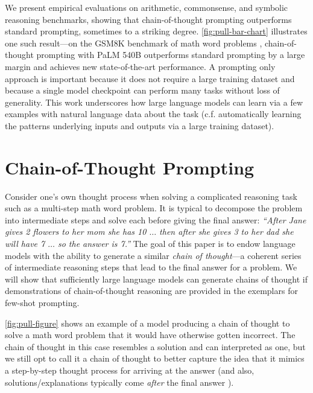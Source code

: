 \documentclass[]{article}
\theoremstyle{plain}
\theoremstyle{definition}
\theoremstyle{remark}
\newcommand{\palm}[0]{PaLM}
\begin{document}
We present empirical evaluations on arithmetic, commonsense, and symbolic reasoning benchmarks, showing that chain-of-thought prompting outperforms standard prompting, sometimes to a striking degree.
\cref{fig:pull-bar-chart} illustrates one such result---on the GSM8K benchmark of math word problems \citep{cobbe2021training}, chain-of-thought prompting with \palm{} 540B outperforms standard prompting by a large margin and achieves new state-of-the-art performance.
A prompting only approach is important because it does not require a large training dataset and because a single model checkpoint can perform many tasks without loss of generality.
This work underscores how large language models can learn via a few examples with natural language data about the task (c.f. automatically learning the patterns underlying inputs and outputs via a large training dataset).

\section{Chain-of-Thought Prompting}
Consider one's own thought process when solving a complicated reasoning task such as a multi-step math word problem. 
It is typical to decompose the problem into intermediate steps and solve each before giving the final answer: \textit{``After Jane gives 2 flowers to her mom she has 10 $\ldots$ then after she gives 3 to her dad she will have 7 $\ldots$ so the answer is 7.''}
The goal of this paper is to endow language models with the ability to generate a similar \textit{chain of thought}---a coherent series of intermediate reasoning steps that lead to the final answer for a problem.
We will show that sufficiently large language models can generate chains of thought if demonstrations of chain-of-thought reasoning are provided in the exemplars for few-shot prompting.

\cref{fig:pull-figure} shows an example of a model producing a chain of thought to solve a math word problem that it would have otherwise gotten incorrect.
The chain of thought in this case resembles a solution and can interpreted as one, but we still opt to call it a chain of thought to better capture the idea that it mimics a step-by-step thought process for arriving at the answer (and also, solutions/explanations typically come \textit{after} the final answer \citep[][\textit{inter alia}]{narang2020wt5,wiegreffe2021reframing,lampinen2022can}).
\end{document}

